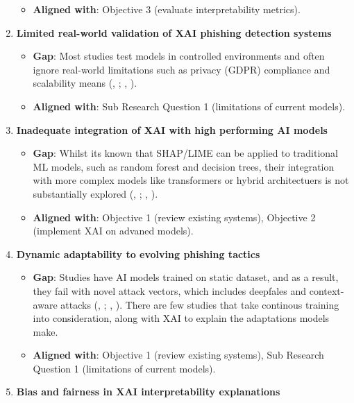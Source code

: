 \begin{enumerate}
\begin{itemize}
    \item \textbf{Aligned with}: Objective 3 (evaluate interpretability metrics).
  \end{itemize}
  \item \textbf{Limited real-world validation of XAI phishing detection systems}
  \begin{itemize}
    \item \textbf{Gap}: Most studies test models in controlled environments and often ignore real-world limitations such as privacy (GDPR) compliance and scalability means (\citeauthor{kapoor2024comparative}, \citeyear{kapoor2024comparative}; \citeauthor{atlam2022business}, \citeyear{atlam2022business}).
    \item \textbf{Aligned with}: Sub Research Question 1 (limitations of current models).
  \end{itemize}
  \item \textbf{Inadequate integration of XAI with high performing AI models}  \begin{itemize}
    \item \textbf{Gap}: Whilst its known that SHAP/LIME can be applied to traditional ML models, such as random forest and decision trees, their integration with more complex models like transformers or hybrid architectuers is not substantially explored (\citeauthor{alzahrani2024explainable}, \citeyear{alzahrani2024explainable}; \citeauthor{lim2025explicate}, \citeyear{lim2025explicate}).
    \item \textbf{Aligned with}: Objective 1 (review existing systems), Objective 2 (implement XAI on advaned models).
  \end{itemize}
  \item \textbf{Dynamic adaptability to evolving phishing tactics}
  \begin{itemize}
    \item \textbf{Gap}: Studies have AI models trained on static dataset, and as a result, they fail with novel attack vectors, which includes deepfales and context-aware attacks (\citeauthor{kapoor2024comparative}, \citeyear{kapoor2024comparative}; \citeauthor{atlam2022business}, \citeyear{atlam2022business}). There are few studies that take continous training into consideration, along with XAI to explain the adaptations models make.
    \item \textbf{Aligned with}: Objective 1 (review existing systems), Sub Research Question 1 (limitations of current models).
  \end{itemize}
  \item \textbf{Bias and fairness in XAI interpretability explanations}  \begin{itemize}

\end{itemize}
\end{enumerate}

